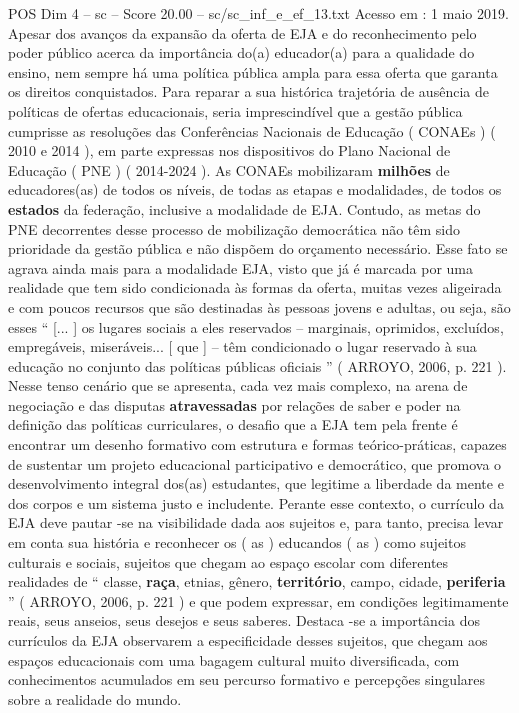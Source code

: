 \begin{textsample}{POS Dim 4 – sc – Score 20.00 – sc/sc\_inf\_e\_ef\_13.txt}
Acesso em : 1 maio 2019.
Apesar dos avanços da expansão da oferta de EJA e do reconhecimento pelo poder público acerca da importância do(a) educador(a) para a qualidade do ensino, nem sempre há uma política pública ampla para essa oferta que garanta os direitos conquistados.
Para reparar a sua histórica trajetória de ausência de políticas de ofertas educacionais, seria imprescindível que a gestão pública cumprisse as resoluções das Conferências Nacionais de Educação ( CONAEs ) ( 2010 e 2014 ), em parte expressas nos dispositivos do Plano Nacional de Educação ( PNE ) ( 2014-2024 ).
As CONAEs mobilizaram \textbf{milhões} de educadores(as) de todos os níveis, de todas as etapas e modalidades, de todos os \textbf{estados} da federação, inclusive a modalidade de EJA.
Contudo, as metas do PNE decorrentes desse processo de mobilização democrática não têm sido prioridade da gestão pública e não dispõem do orçamento necessário.
Esse fato se agrava ainda mais para a modalidade EJA, visto que já é marcada por uma realidade que tem sido condicionada às formas da oferta, muitas vezes aligeirada e com poucos recursos que são destinadas às pessoas jovens e adultas, ou seja, são esses “ [... ] os lugares sociais a eles reservados – marginais, oprimidos, excluídos, empregáveis, miseráveis... [ que ] – têm condicionado o lugar reservado à sua educação no conjunto das políticas públicas oficiais ” ( ARROYO, 2006, p. 221 ).
Nesse tenso cenário que se apresenta, cada vez mais complexo, na arena de negociação e das disputas \textbf{atravessadas} por relações de saber e poder na definição das políticas curriculares, o desafio que a EJA tem pela frente é encontrar um desenho formativo com estrutura e formas teórico-práticas, capazes de sustentar um projeto educacional participativo e democrático, que promova o desenvolvimento integral dos(as) estudantes, que legitime a liberdade da mente e dos corpos e um sistema justo e includente.
Perante esse contexto, o currículo da EJA deve pautar -se na visibilidade dada aos sujeitos e, para tanto, precisa levar em conta sua história e reconhecer os ( as ) educandos ( as ) como sujeitos culturais e sociais, sujeitos que chegam ao espaço escolar com diferentes realidades de “ classe, \textbf{raça}, etnias, gênero, \textbf{território}, campo, cidade, \textbf{periferia} ” ( ARROYO, 2006, p. 221 ) e que podem expressar, em condições legitimamente reais, seus anseios, seus desejos e seus saberes.
Destaca -se a importância dos currículos da EJA observarem a especificidade desses sujeitos, que chegam aos espaços educacionais com uma bagagem cultural muito diversificada, com conhecimentos acumulados em seu percurso formativo e percepções singulares sobre a realidade do mundo.

\end{textsample}
